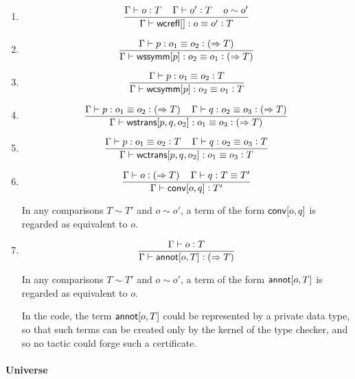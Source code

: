 \documentclass[11pt]{article}
\newcommand{\eqd}{\equiv}
\newcommand{\spc}{{\,\,\,\,\,\,\,}}
\newcommand{\synth}[1]{\vcentcolon(\Rightarrow#1)} %
\newcommand{\ccheck}[1]{\vcentcolon#1}  %
\newcommand{\ha}[2]{#1[#2]}
\newcommand{\annot}{{\sf annot}}
\newcommand{\conv}{{\sf conv}}
\newcommand{\wcrefl}{{\sf wcrefl}}
\newcommand{\wssymm}{{\sf wssymm}}
\newcommand{\wcsymm}{{\sf wcsymm}}
\newcommand{\wstrans}{{\sf wstrans}}
\newcommand{\wctrans}{{\sf wctrans}}
\begin{document}
\begin{enumerate}
\item 
$$\frac{\Gamma\vdash o \ccheck{T}\spc\Gamma\vdash o' \ccheck{T} \spc o \sim o'}{\Gamma\vdash \ha\wcrefl{}:o\eqd o' \ccheck{T}}$$

\item 
$$\frac{\Gamma\vdash p:o_1\eqd o_2 \synth{T}}{\Gamma\vdash \ha\wssymm{p}:o_2\eqd o_1 \synth{T}}$$

\item 
$$\frac{\Gamma\vdash p:o_1\eqd o_2 \ccheck{T}}{\Gamma\vdash \ha\wcsymm{p}:o_2\eqd o_1 \ccheck{T}}$$

\item 
$$\frac{\Gamma\vdash p:o_1\eqd o_2 \synth{T}\spc\Gamma\vdash q:o_2\eqd o_3 \synth{T}}{\Gamma\vdash \ha\wstrans{p,q,o_2}:o_1\eqd o_3 \synth{T}}$$

\item 
$$\frac{\Gamma\vdash p:o_1\eqd o_2 \ccheck{T}\spc\Gamma\vdash q:o_2\eqd o_3 \ccheck{T}}{\Gamma\vdash \ha\wctrans{p,q,o_2}:o_1\eqd o_3 \ccheck{T}}$$

\item 
$$\frac{\Gamma\vdash o \synth{T}\spc \Gamma\vdash q : T \eqd T'}{\Gamma\vdash \ha\conv{o,q} \ccheck{T'}}$$

In any comparisons $T\sim T'$ and $o\sim o'$, a term of the form
$\ha\conv{o,q}$ is regarded as equivalent to $o$.

\item 
$$\frac{\Gamma\vdash o \ccheck{T}}{\Gamma\vdash \ha\annot{o,T} \synth{T}}$$

In any comparisons $T\sim T'$ and $o\sim o'$, a term of the form
$\ha\annot{o,T}$ is regarded as equivalent to $o$.

In the code, the term $\ha\annot{o,T}$ could be represented by a private data
type, so that such terms can be created only by the kernel of the type checker,
and so no tactic could forge such a certificate.

\end{enumerate}

\paragraph{Universe}
\end{document}
